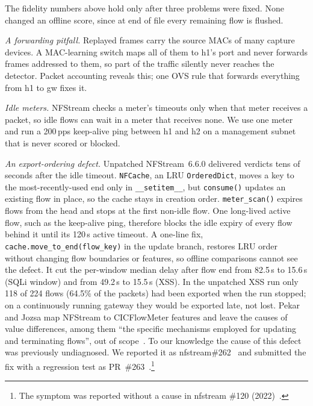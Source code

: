 The fidelity numbers above hold only after three problems were fixed. None changed an offline score, since at end of file every remaining flow is flushed.

\emph{A forwarding pitfall.} Replayed frames carry the source MACs of many capture devices. A MAC-learning switch maps all of them to h1's port and never forwards frames addressed to them, so part of the traffic silently never reaches the detector. Packet accounting reveals this; one OVS rule that forwards everything from h1 to gw fixes it.

\emph{Idle meters.} NFStream checks a meter's timeouts only when that meter receives a packet, so idle flows can wait in a meter that receives none. We use one meter and run a 200\,pps keep-alive ping between h1 and h2 on a management subnet that is never scored or blocked.

\emph{An export-ordering defect.} Unpatched NFStream~6.6.0 delivered verdicts tens of seconds after the idle timeout. \texttt{NFCache}, an LRU \texttt{OrderedDict}, moves a key to the most-recently-used end only in \texttt{\_\_setitem\_\_}, but \texttt{consume()} updates an existing flow in place, so the cache stays in creation order. \texttt{meter\_scan()} expires flows from the head and stops at the first non-idle flow. One long-lived active flow, such as the keep-alive ping, therefore blocks the idle expiry of every flow behind it until its 120\,s active timeout. A one-line fix, \texttt{cache.move\_to\_end(flow\_key)} in the update branch, restores LRU order without changing flow boundaries or features, so offline comparisons cannot see the defect. It cut the per-window median delay after flow end from 82.5\,s to 15.6\,s (SQLi window) and from 49.2\,s to 15.5\,s (XSS). In the unpatched XSS run only 118 of 224 flows (64.5\% of the packets) had been exported when the run stopped; on a continuously running gateway they would be exported late, not lost. Pekar and Jozsa map NFStream to CICFlowMeter features and leave the causes of value differences, among them ``the specific mechanisms employed for updating and terminating flows'', out of scope~\cite{pekar2024integrity}. To our knowledge the cause of this defect was previously undiagnosed. We reported it as nfstream\#262~\cite{nfstream262} and submitted the fix with a regression test as PR~\#263~\cite{nfstream263}.\footnote{The symptom was reported without a cause in nfstream \#120 (2022)~\cite{nfstream120}.}
